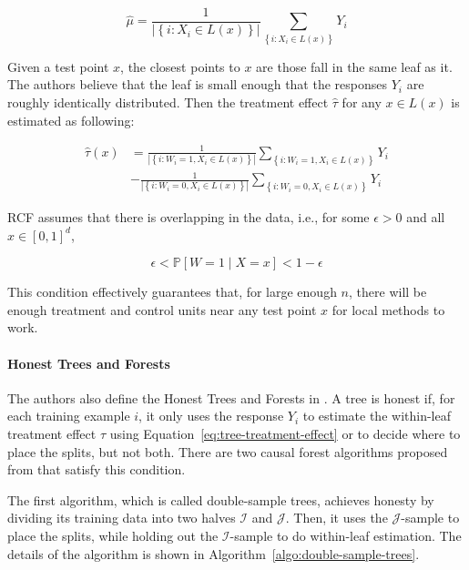 \documentclass{article}
\begin{document}
$$\hat{\mu} = \frac{1}{\left | \left \{ i: X_i \in L(x) \right \}
  \right |} \sum_{\left \{ i: X_i \in L(x) \right \}} Y_i$$

Given a test point $x$, the closest points to $x$ are those fall in the same
leaf as it. The authors believe that the leaf is small enough that the
responses $Y_i$ are roughly identically distributed. Then the
treatment effect $\hat{\tau}$ for any $x \in L(x)$ is estimated as
following:

\begin{align} 
\hat{\tau}(x) & = \frac{1}{\left | \left \{ i: W_i=1, X_i \in L(x) \right \}
                \right |} \sum_{\left \{ i: W_i = 1, X_i \in L(x)
                \right \}} Y_i \nonumber \\
              & - \frac{1}{\left | \left \{ i: W_i=0, X_i \in L(x) \right \}
  \right |} \sum_{\left \{ i: W_i = 0, X_i \in L(x) \right \}} Y_i \label{eq:tree-treatment-effect}
\end{align}

RCF assumes that
there is overlapping in the data, i.e., for some $\epsilon > 0$ and
all $x \in \left [ 0, 1\right ]^d$,

$$\epsilon < \mathbb{P}\left [ W=1 \mid X=x \right ] < 1-\epsilon$$

This condition effectively guarantees that, for large enough $n$,
there will be enough treatment and control units near any test point
$x$ for local methods to work.

\paragraph{Honest Trees and Forests}
The authors also define the Honest Trees and Forests in \cite{wager2015estimation}.
A tree is honest if, for each training example $i$, it only uses the
response $Y_i$ to estimate the within-leaf treatment effect $\tau$
using Equation~\ref{eq:tree-treatment-effect} or
to decide where to place the splits, but not
both. There are two causal forest algorithms proposed from
\cite{wager2015estimation} that satisfy this condition.

The first algorithm, which is called double-sample trees, achieves
honesty by dividing its training data into two halves
$\mathcal{I}$ and $\mathcal{J}$. Then, it uses the
$\mathcal{J}$-sample to place the splits, while holding out the
$\mathcal{I}$-sample to do within-leaf estimation. The details of the
algorithm is shown in Algorithm~\ref{algo:double-sample-trees}.
\end{document}
